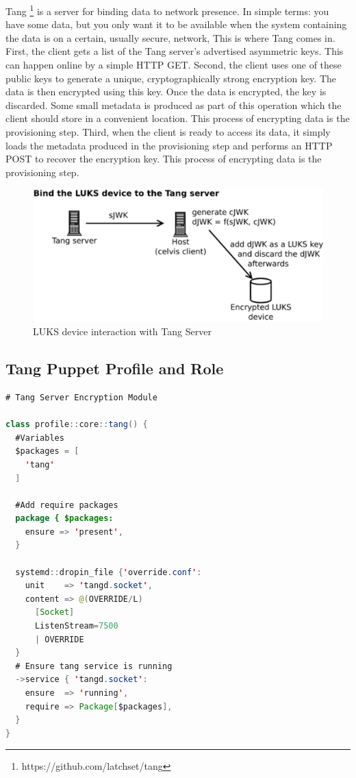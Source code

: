 Tang \footnote[3]{https://github.com/latchset/tang} is a server for binding data to network presence. In simple terms: you have some data, but you only want it to be available when the system containing the data is on a certain, usually secure, network, This is where Tang comes in.
First, the client gets a list of the Tang server's advertised asymmetric keys. This can happen online by a simple HTTP GET.
Second, the client uses one of these public keys to generate a unique, cryptographically strong encryption key. The data is then encrypted using this key. Once the data is encrypted, the key is discarded. Some small metadata is produced as part of this operation which the client should store in a convenient location. This process of encrypting data is the provisioning step.
Third, when the client is ready to access its data, it simply loads the metadata produced in the provisioning step and performs an HTTP POST to recover the encryption key. This process of encrypting data is the provisioning step.

\vskip 2cm
\begin{figure}
  \includegraphics[width=14cm]{images/image3.png}
  \centering
  \caption{LUKS device interaction with Tang Server}
\end{figure}

\newpage
\subsection{Tang Puppet Profile and Role}

\begin{lstlisting}[language=Java]
# Tang Server Encryption Module

class profile::core::tang() {
  #Variables
  $packages = [
    'tang'
  ]

  #Add require packages
  package { $packages:
    ensure => 'present',
  }

  systemd::dropin_file {'override.conf':
    unit    => 'tangd.socket',
    content => @(OVERRIDE/L)
      [Socket]
      ListenStream=7500
      | OVERRIDE
  }
  # Ensure tang service is running
  ->service { 'tangd.socket':
    ensure  => 'running',
    require => Package[$packages],
  }
}
\end{lstlisting}

